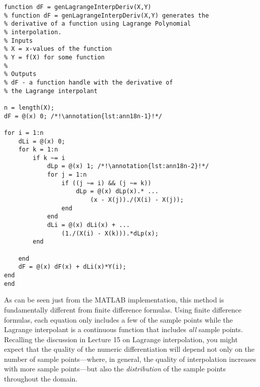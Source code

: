 \begin{lstlisting}[style=myMatlab,name=lec18n-ex1]
function dF = genLagrangeInterpDeriv(X,Y)
% function dF = genLagrangeInterpDeriv(X,Y) generates the 
% derivative of a function using Lagrange Polynomial 
% interpolation.
% Inputs
% X = x-values of the function
% Y = f(X) for some function
%
% Outputs
% dF - a function handle with the derivative of 
% the Lagrange interpolant

n = length(X);
dF = @(x) 0; /*!\annotation{lst:ann18n-1}!*/

for i = 1:n
    dLi = @(x) 0;
    for k = 1:n
        if k ~= i
            dLp = @(x) 1; /*!\annotation{lst:ann18n-2}!*/
            for j = 1:n
                if ((j ~= i) && (j ~= k))
                    dLp = @(x) dLp(x).* ...
                        (x - X(j))./(X(i) - X(j));
                end
            end
            dLi = @(x) dLi(x) + ...
                (1./(X(i) - X(k))).*dLp(x);
        end
        
    end
    dF = @(x) dF(x) + dLi(x)*Y(i);
end
end
\end{lstlisting}

As can be seen just from the MATLAB implementation, this method is fundamentally different from finite difference formulas.  Using finite difference formulas, each equation only includes a few of the sample points while the Lagrange interpolant is a continuous function that includes \emph{all} sample points.  Recalling the discussion in Lecture 15 on Lagrange interpolation, you might expect that the quality of the numeric differentiation will depend not only on the number of sample points---where, in general, the quality of interpolation increases with more sample points---but also the \emph{distribution} of the sample points throughout the domain.  

\vspace{0.5cm}

